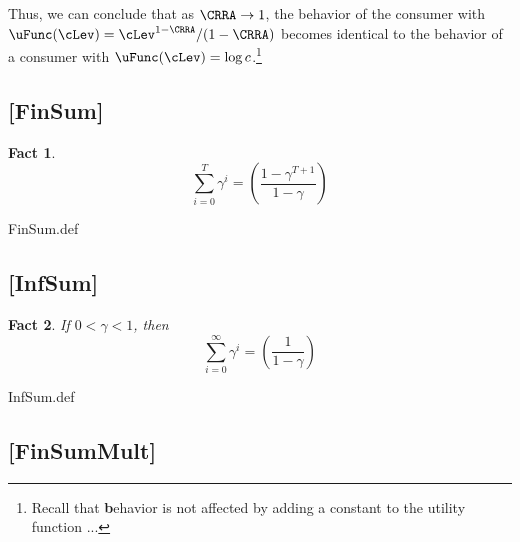 \message{ !name(MathFactsList.tex)}\documentclass{handout}
\newtheorem{Fact}{Fact}
\begin{document}
Thus, we can conclude that as $\CRRA \rightarrow 1$, the behavior of
the consumer with $\uFunc(\cLev)=\cLev^{1-\CRRA}/(1-\CRRA)$ becomes identical to
the behavior of a consumer with $\uFunc(\cLev)=\log c$.\footnote{Recall that \textbf{b}ehavior is not affected by adding a constant to the utility function ...}


\hypertarget{FinSum}{}
\subsection{[FinSum]}\label{fact:FinSum} 


\begin{Fact} 
\begin{equation}
\displaystyle \sum_{i=0}^{T} \gamma^{i} = \left(\frac{1-\gamma^{T+1}}{1-\gamma}\right)
\end{equation} 
\end{Fact}

\begin{verbatimwrite}{FinSum.def}
\providecommand{\FinSum}{\href{https://www.econ2.jhu.edu/people/ccarroll/public/LectureNotes/MathFacts/MathFactsList\#FinSum}{\ensuremath{\mathtt{[FinSum]}}}}
\end{verbatimwrite}


\hypertarget{InfSum}{}

\subsection{[InfSum]}\label{fact:InfSum}


\begin{Fact} If $0 < \gamma < 1$, then 
\begin{equation}
\displaystyle \sum_{i=0}^{\infty} \gamma^{i} = \left(\frac{1}{1-\gamma}\right)
\end{equation}
\end{Fact}

\begin{verbatimwrite}{InfSum.def}
\providecommand{\InfSum}{\href{https://www.econ2.jhu.edu/people/ccarroll/public/LectureNotes/MathFacts/MathFactsList\#InfSum}{\ensuremath{\mathtt{[InfSum]}}}}
\end{verbatimwrite}

\hypertarget{FinSumMult}{}
\subsection{[FinSumMult]}\label{fact:FinSumMult} 
\end{document}
